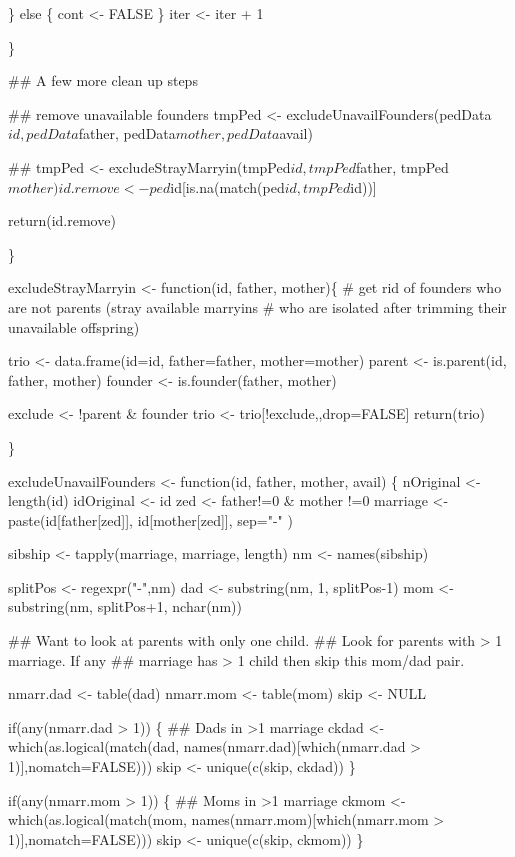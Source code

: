 \documentclass{article}
\begin{document}
    \}
    else \{
      cont <- FALSE
    \}
    iter <- iter + 1   
    
  \}
  
  ## A few more clean up steps

  ## remove unavailable founders
  tmpPed <- excludeUnavailFounders(pedData$id, 
                        pedData$father, pedData$mother, pedData$avail)

  ## 
  tmpPed <- excludeStrayMarryin(tmpPed$id, tmpPed$father, tmpPed$mother)

  
  id.remove <- ped$id[is.na(match(ped$id, tmpPed$id))]

  return(id.remove)
  
\}


excludeStrayMarryin <- function(id, father, mother)\{
  # get rid of founders who are not parents (stray available marryins
  # who are isolated after trimming their unavailable offspring)
  
  trio <- data.frame(id=id, father=father, mother=mother)
  parent <- is.parent(id, father, mother)
  founder <- is.founder(father, mother)

  exclude <- !parent & founder
  trio <- trio[!exclude,,drop=FALSE]
  return(trio)

\}

excludeUnavailFounders <- function(id, father, mother, avail)
  \{
    nOriginal <- length(id)
    idOriginal <- id   
    zed <- father!=0 & mother !=0
    marriage <- paste(id[father[zed]], id[mother[zed]], sep="-" )

    sibship <- tapply(marriage, marriage, length)
    nm <- names(sibship)

    splitPos <- regexpr("-",nm)
    dad <- substring(nm, 1, splitPos-1)
    mom <- substring(nm, splitPos+1,  nchar(nm))
    
    ##  Want to look at parents with only one child.
    ##  Look for parents with > 1 marriage.  If any
    ##  marriage has > 1 child then skip this mom/dad pair.
    
    nmarr.dad <- table(dad)
    nmarr.mom <- table(mom)
    skip <- NULL
    
    if(any(nmarr.dad > 1)) \{
      ## Dads in >1 marriage
      ckdad <- which(as.logical(match(dad,
                      names(nmarr.dad)[which(nmarr.dad > 1)],nomatch=FALSE)))
      skip <- unique(c(skip, ckdad))
    \}
    
    if(any(nmarr.mom > 1)) \{
      ## Moms in >1 marriage
      ckmom <- which(as.logical(match(mom,
                      names(nmarr.mom)[which(nmarr.mom > 1)],nomatch=FALSE)))
      skip <- unique(c(skip, ckmom))
    \}
      
\end{document}
